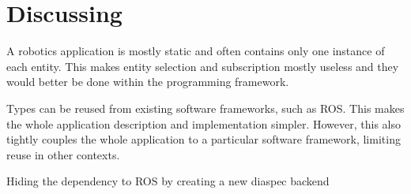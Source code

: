 \section{Discussing}
\label{sec:discussing}

A robotics application is mostly static and often contains only one
instance of each entity. This makes entity selection and subscription
mostly useless and they would better be done within the programming
framework.

Types can be reused from existing software frameworks, such as ROS.
This makes the whole application description and implementation
simpler. However, this also tightly couples the whole application to a
particular software framework, limiting reuse in other contexts.

Hiding the dependency to ROS by creating a new diaspec backend
